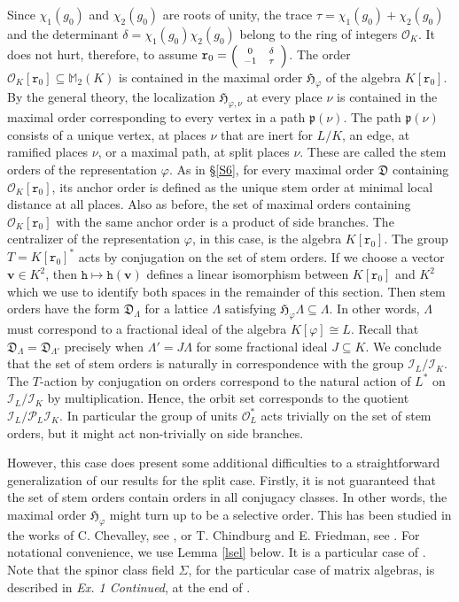 \documentclass{article}
\theoremstyle{definition}
\theoremstyle{remark}
\newcommand\sbmattrix[4]{\textnormal{\scriptsize$\left(\begin{array}{cc}#1&#2\\#3&#4\end{array}\right)$\normalsize}}
\begin{document}
Since $\chi_1(g_0)$ and 
$\chi_2(g_0)$ are roots of unity, the trace
$\tau=\chi_1(g_0)+\chi_2(g_0)$ and the determinant
$\delta=\chi_1(g_0)\chi_2(g_0)$ belong to the ring of integers
$\mathcal{O}_K$. It does not hurt, therefore, to assume
$\mathtt{r}_0=\sbmattrix 0\delta{-1}\tau$.
The order $\mathcal{O}_K[\mathtt{r}_0]\subseteq
\mathbb{M}_2(K)$ is contained in the maximal order
$\mathfrak{H}_\varphi$ of the algebra 
$K[\mathtt{r}_0]$. By the general 
theory, the localization 
$\mathfrak{H}_{\varphi,\nu}$ at every place
$\nu$ is contained in the maximal order corresponding to
every vertex in a path $\mathfrak{p}(\nu)$.
The path $\mathfrak{p}(\nu)$ consists of a unique vertex, 
at places $\nu$ that are inert for $L/K$, 
an edge, at ramified places $\nu$,
or a maximal path, at split places $\nu$. 
These are called the stem
orders of the representation $\varphi$. 
As in \S\ref{S6}, for every maximal 
order $\mathfrak{D}$ containing $\mathcal{O}_K[\mathtt{r}_0]$,
its anchor order is defined as 
the unique stem order at minimal local distance
at all places. Also as before, the set of 
maximal orders containing
$\mathcal{O}_K[\mathtt{r}_0]$ with the same 
anchor order is a product
of side branches. The centralizer of the 
representation $\varphi$,
in this case, is the algebra $K[\mathtt{r}_0]$. The group
$T=K[\mathtt{r}_0]^*$ acts by conjugation on 
the set of stem orders.
If we choose a vector $\mathbf{v}\in K^2$, then
$\mathtt{h}\mapsto \mathtt{h}\left(\mathbf{v}\right)$ 
defines a linear 
isomorphism between $K[\mathtt{r}_0]$ and $K^2$ 
which we use to identify
both spaces in the remainder of this section. Then stem orders
have the form $\mathfrak{D}_\Lambda$ for a lattice $\Lambda$
satisfying $\mathfrak{H}_\varphi\Lambda\subseteq\Lambda$. 
In other
words, $\Lambda$ must correspond to a fractional ideal of the
algebra $K[\varphi]\cong L$. Recall that $\mathfrak{D}_\Lambda=
\mathfrak{D}_{\Lambda'}$ precisely when $\Lambda'=J\Lambda$
for some fractional ideal $J\subseteq K$. We conclude that 
the set of stem orders is naturally in correspondence with 
the group
$\mathcal{I}_L/\mathcal{I}_K$. The $T$-action by conjugation
on orders correspond to the natural action of $L^*$
on $\mathcal{I}_L/\mathcal{I}_K$ by multiplication. 
Hence, the orbit
set corresponds to the quotient 
$\mathcal{I}_L/\mathcal{P}_L\mathcal{I}_K$.
In particular the group of units 
$\mathcal{O}_L^*$ acts trivially
on the set of stem orders, but it might 
act non-trivially on side 
branches.

However, this case does present some additional difficulties to
a straightforward generalization of our results for
the split case. Firstly, it is not guaranteed 
that the set of stem 
orders contain orders in all conjugacy classes. In other words,
the maximal order $\mathfrak{H}_\varphi$ might turn up to be a 
selective order. This has been studied in the works of
C. Chevalley, see \cite{che36}, or  T. Chindburg and 
E. Friedman, see \cite{chi99}. For notational convenience, we 
use Lemma \ref{lsel} below. It is a particular case
of \cite[Th. 1]{A03}. Note that the spinor class 
field $\Sigma$,
for the particular case of matrix algebras,
is described in \textit{Ex. 1 Continued}, at the end of
\cite[\S2]{A03}.
\end{document}
